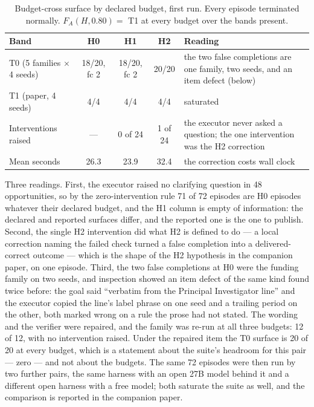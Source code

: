 \begin{table}[H]
\centering\small
\begin{tabularx}{\textwidth}{@{}lcccY@{}}
\toprule
Band & H0 & H1 & H2 & Reading \\
\midrule
T0 (5 families $\times$ 4 seeds) & 18/20, fc 2 & 18/20, fc 2 & 20/20 & the two false completions are one family, two seeds, and an item defect (below) \\
T1 (paper, 4 seeds) & 4/4 & 4/4 & 4/4 & saturated \\
Interventions raised & --- & 0 of 24 & 1 of 24 & the executor never asked a question; the one intervention was the H2 correction \\
Mean seconds & 26.3 & 23.9 & 32.4 & the correction costs wall clock \\
\bottomrule
\end{tabularx}
\caption{Budget-cross surface by declared budget, first run. Every episode terminated normally. $F_A(H, 0.80) = $ T1 at every budget over the bands present.}
\label{tab:budgetcross}
\end{table}

Three readings. First, the executor raised no clarifying question in 48 opportunities, so by the zero-intervention rule 71 of 72 episodes are H0 episodes whatever their declared budget, and the H1 column is empty of information: the declared and reported surfaces differ, and the reported one is the one to publish. Second, the single H2 intervention did what H2 is defined to do --- a local correction naming the failed check turned a false completion into a delivered-correct outcome --- which is the shape of the H2 hypothesis in the companion paper, on one episode. Third, the two false completions at H0 were the funding family on two seeds, and inspection showed an item defect of the same kind found twice before: the goal said ``verbatim from the Principal Investigator line'' and the executor copied the line's label phrase on one seed and a trailing period on the other, both marked wrong on a rule the prose had not stated. The wording and the verifier were repaired, and the family was re-run at all three budgets: 12 of 12, with no intervention raised. Under the repaired item the T0 surface is 20 of 20 at every budget, which is a statement about the suite's headroom for this pair --- zero --- and not about the budgets. The same 72 episodes were then run by two further pairs, the same harness with an open 27B model behind it and a different open harness with a free model; both saturate the suite as well, and the comparison is reported in the companion paper.

